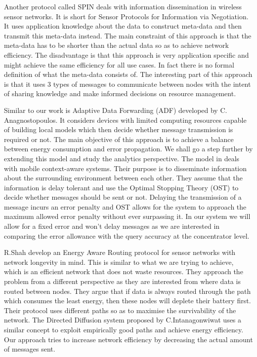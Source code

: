 \documentclass{mproj}
\begin{document}
Another protocol called SPIN \cite{adaptiveProtocols} deals with information dissemination in wireless sensor networks. It is short for Sensor Protocols for Information via Negotiation. It uses application knowledge about the data to construct meta-data and then transmit this meta-data instead. The main constraint of this approach is that the meta-data has to be shorter than the actual data so as to achieve network efficiency. The disadvantage is that this approach is very application specific and might achieve the same efficiency for all use cases. In fact there is no formal definition of what the meta-data consists of. The interesting part of this approach is that it uses 3 types of messages to communicate between nodes with the intent of sharing knowledge and make informed decisions on resource management.

Similar to our work is Adaptive Data Forwarding (ADF)\cite{adaptiveDataForwarding} developed by C. Anagnostopoulos. It considers devices with limited computing resources capable of building local models which then decide whether message transmission is required or not. The main objective of this approach is to achieve a balance between energy consumption and error propagation. We shall go a step further by extending this model and study the analytics perspective. The model in \cite{timeOptimizedContextual} deals with mobile context-aware systems. Their purpose is to disseminate information about the surrounding environment between each other. They assume that the information is delay tolerant and use the Optimal Stopping Theory (OST) to decide whether messages should be sent or not. Delaying the transmission of a message incurs an error penalty and OST allows for the system to approach the maximum allowed error penalty without ever surpassing it. In our system we will allow for a fixed error and won't delay messages as we are interested in comparing the error allowance with the query accuracy at the concentrator level.

R.Shah develop an Energy Aware Routing protocol \cite{energyAwareRouting} for sensor networks with network longevity in mind. This is similar to what we are trying to achieve, which is an efficient network that does not waste resources. They approach the problem from a different perspective as they are interested from where data is routed between nodes. They argue that if data is always routed through the path which consumes the least energy, then these nodes will deplete their battery first. Their protocol uses different paths so as to maximise the survivability of the network. The Directed Diffusion \cite{directedDiffusion} system proposed by C.Intanagonwiwat uses a similar concept to exploit empirically good paths and achieve energy efficiency. Our approach tries to increase network efficiency by decreasing the actual amount of messages sent.
\end{document}
